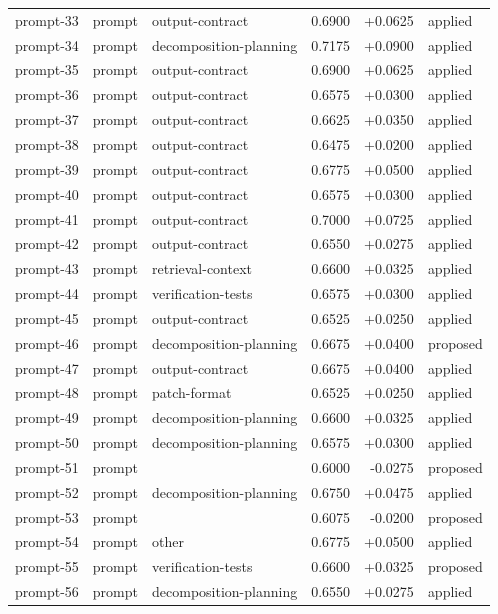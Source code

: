 \begin{center}
\begin{longtable}{llp{5.2cm}rrl}
prompt-33 & prompt & output-contract & 0.6900 & +0.0625 & applied \\
prompt-34 & prompt & decomposition-planning & 0.7175 & +0.0900 & applied \\
prompt-35 & prompt & output-contract & 0.6900 & +0.0625 & applied \\
prompt-36 & prompt & output-contract & 0.6575 & +0.0300 & applied \\
prompt-37 & prompt & output-contract & 0.6625 & +0.0350 & applied \\
prompt-38 & prompt & output-contract & 0.6475 & +0.0200 & applied \\
prompt-39 & prompt & output-contract & 0.6775 & +0.0500 & applied \\
prompt-40 & prompt & output-contract & 0.6575 & +0.0300 & applied \\
prompt-41 & prompt & output-contract & 0.7000 & +0.0725 & applied \\
prompt-42 & prompt & output-contract & 0.6550 & +0.0275 & applied \\
prompt-43 & prompt & retrieval-context & 0.6600 & +0.0325 & applied \\
prompt-44 & prompt & verification-tests & 0.6575 & +0.0300 & applied \\
prompt-45 & prompt & output-contract & 0.6525 & +0.0250 & applied \\
prompt-46 & prompt & decomposition-planning & 0.6675 & +0.0400 & proposed \\
prompt-47 & prompt & output-contract & 0.6675 & +0.0400 & applied \\
prompt-48 & prompt & patch-format & 0.6525 & +0.0250 & applied \\
prompt-49 & prompt & decomposition-planning & 0.6600 & +0.0325 & applied \\
prompt-50 & prompt & decomposition-planning & 0.6575 & +0.0300 & applied \\
prompt-51 & prompt &  & 0.6000 & -0.0275 & proposed \\
prompt-52 & prompt & decomposition-planning & 0.6750 & +0.0475 & applied \\
prompt-53 & prompt &  & 0.6075 & -0.0200 & proposed \\
prompt-54 & prompt & other & 0.6775 & +0.0500 & applied \\
prompt-55 & prompt & verification-tests & 0.6600 & +0.0325 & proposed \\
prompt-56 & prompt & decomposition-planning & 0.6550 & +0.0275 & applied \\

\end{longtable}
\end{center}
